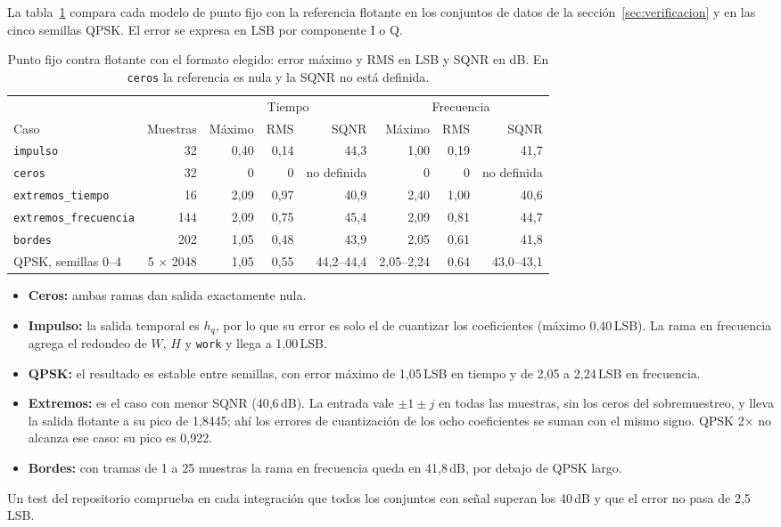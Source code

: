 La tabla~\ref{tab:flotante-fijo} compara cada modelo de punto fijo con la referencia flotante en los conjuntos de datos de la sección~\ref{sec:verificacion} y en las cinco semillas QPSK. El error se expresa en LSB por componente I o Q.

\begin{table}[h]
  \centering
  \caption{Punto fijo contra flotante con el formato elegido: error máximo y RMS en LSB y SQNR en dB. En \texttt{ceros} la referencia es nula y la SQNR no está definida.}\label{tab:flotante-fijo}
  \small\setlength{\tabcolsep}{4pt}
  \begin{tabular}{lrrrrrrr}
    \toprule
    & & \multicolumn{3}{c}{Tiempo} & \multicolumn{3}{c}{Frecuencia} \\
    \cmidrule(lr){3-5}\cmidrule(lr){6-8}
    Caso & Muestras & Máximo & RMS & SQNR & Máximo & RMS & SQNR \\
    \midrule
    \texttt{impulso} & 32 & 0,40 & 0,14 & 44,3 & 1,00 & 0,19 & 41,7 \\
    \texttt{ceros} & 32 & 0 & 0 & no definida & 0 & 0 & no definida \\
    \texttt{extremos\_tiempo} & 16 & 2,09 & 0,97 & 40,9 & 2,40 & 1,00 & 40,6 \\
    \texttt{extremos\_frecuencia} & 144 & 2,09 & 0,75 & 45,4 & 2,09 & 0,81 & 44,7 \\
    \texttt{bordes} & 202 & 1,05 & 0,48 & 43,9 & 2,05 & 0,61 & 41,8 \\
    QPSK, semillas 0–4 & 5 × 2048 & 1,05 & 0,55 & 44,2–44,4 & 2,05–2,24 & 0,64 & 43,0–43,1 \\
    \bottomrule
  \end{tabular}
\end{table}

\begin{itemize}
  \item \textbf{Ceros:} ambas ramas dan salida exactamente nula.
  \item \textbf{Impulso:} la salida temporal es $h_q$, por lo que su error es solo el de cuantizar los coeficientes (máximo 0,40\,LSB). La rama en frecuencia agrega el redondeo de $W$, $H$ y \texttt{work} y llega a 1,00\,LSB.
  \item \textbf{QPSK:} el resultado es estable entre semillas, con error máximo de 1,05\,LSB en tiempo y de 2,05 a 2,24\,LSB en frecuencia.
  \item \textbf{Extremos:} es el caso con menor SQNR (40,6\,dB). La entrada vale $\pm1\pm j$ en todas las muestras, sin los ceros del sobremuestreo, y lleva la salida flotante a su pico de 1,8445; ahí los errores de cuantización de los ocho coeficientes se suman con el mismo signo. QPSK 2× no alcanza ese caso: su pico es 0,922.
  \item \textbf{Bordes:} con tramas de 1 a 25 muestras la rama en frecuencia queda en 41,8\,dB, por debajo de QPSK largo.
\end{itemize}

Un test del repositorio comprueba en cada integración que todos los conjuntos con señal superan los 40\,dB y que el error no pasa de 2,5\,LSB.
